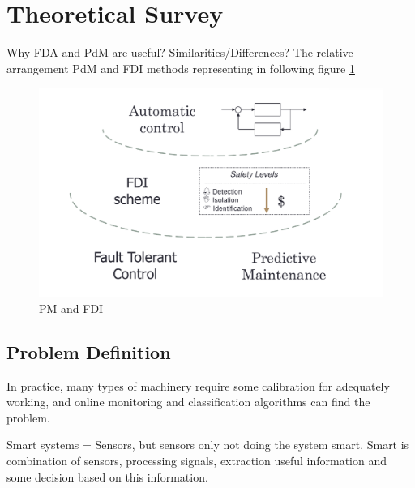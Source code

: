 \documentclass[class=article, crop=false]{standalone}
\begin{document}

% 
\section{Theoretical Survey}
Why FDA and PdM are useful? Similarities/Differences?
The relative arrangement PdM and FDI methods representing in following
figure \ref{fig:fdi_pm}
\begin{figure}[h!]
    \centering
    \includegraphics[scale=0.3]{FDI_PM.png}
    \caption{PM and FDI }
    \label{fig:fdi_pm}
\end{figure}



% 

\subsection{Problem Definition}

In practice, many types of machinery require some calibration for adequately working,
and online monitoring and classification algorithms can find the problem.



Smart systems = Sensors, but sensors only not doing the system smart. Smart
is combination of sensors, processing signals, extraction useful information and
some decision based on this information.
\end{document}
